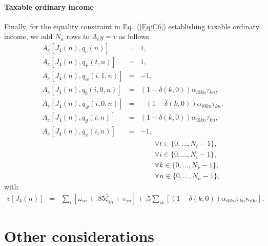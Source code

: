 \documentclass{report}[fleqn,12pt]
\begin{document}
\paragraph*{Taxable ordinary income}
Finally, for the equality constraint in Eq.~(\ref{Eq:C6}) establishing taxable
ordinary income, we add $N_n$ rows to $A_ey = v$ as follows
\begin{eqnarray}
	A_e[J_4(n), q_e(n)] &=& 1, \nonumber \\
	A_e[J_4(n), q_F(t, n)] &=& 1, \nonumber \\
	A_e[J_4(n), q_w(i, 1, n)] &=& -1, \nonumber \\
	A_e[J_4(n), q_b(i, 0, n)] &=&  (1 - \delta(k, 0))\alpha_{i0kn}\tau_{kn}, \\
	A_e[J_4(n), q_w(i, 0, n)] &=& -(1 - \delta(k, 0))\alpha_{i0kn}\tau_{kn}, \nonumber \\
	A_e[J_4(n), q_d(i, n)] &=&     (1 - \delta(k, 0))\alpha_{i0kn}\tau_{kn}, \nonumber \\
	A_e[J_4(n), q_x(i, n)] &=& -1, \nonumber \\
	&&\qquad\forall t \in \{0,\ldots, N_t-1\},\nonumber\\
	&&\qquad\forall i \in \{0,\ldots, N_i-1\},\nonumber\\
	&&\qquad\forall k \in \{0,\ldots, N_k-1\},\nonumber\\
	&&\qquad\forall n \in \{0,\ldots, N_n-1\}, \nonumber
\end{eqnarray}
with
\begin{eqnarray}
	v[J_4(n)] &=& 
	\sum_i [\omega_{in} + .85\bar\zeta_{in}  + \pi_{in}]
	+ .5\sum_{ik} [(1-\delta(k, 0))\alpha_{i0kn}\tau_{kn}\kappa_{i0n}].
\end{eqnarray}

\section{Other considerations}
\end{document}
